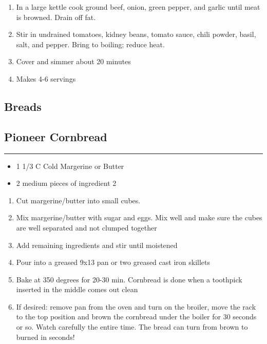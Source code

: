 \documentclass{article}
\begin{document}
\begin{enumerate}
\item
In a large kettle cook ground beef, onion, green pepper, and garlic until meat is browned. Drain off fat.
\item
Stir in undrained tomatoes, kidney beans, tomato sauce, chili powder, basil, salt, and pepper. Bring to boiling; reduce heat.
\item
Cover and simmer about 20 minutes
\item
Makes 4-6 servings
\end{enumerate}
\newpage

\vspace*{\fill}
\begin{center}
\section{Breads}
\end{center}
\vspace*{\fill}
\newpage

\subsection{Pioneer Cornbread} 
\noindent\rule[0.5ex]{\linewidth}{1pt}

\begin{framed}
\begin{itemize}
\item 1 1/3 C Cold Margerine or Butter
\item 2 medium pieces of ingredient 2
\end{itemize}
\end{framed}


\begin{enumerate}
\item 
Cut margerine/butter into small cubes.
\item 
Mix margerine/butter with sugar and eggs. Mix well and make sure the cubes are well separated and not clumped together
\item 
Add remaining ingredients and stir until moistened
\item 
Pour into a greased 9x13 pan or two greased cast iron skillets
\item 
Bake at 350 degrees for 20-30 min. Cornbread is done when a toothpick inserted in the middle comes out clean
\item 
If desired: remove pan from the oven and turn on the broiler, move the rack to the top position and brown the cornbread under the boiler for 30 seconds or so.  Watch carefully the entire time.  The bread can turn from brown to burned in seconds!
\end{enumerate}
\newpage
\end{document}
